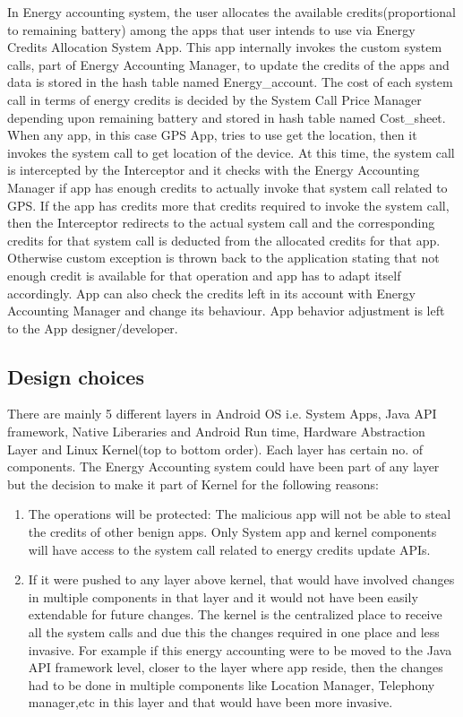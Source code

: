 In Energy accounting system, the user allocates the available credits(proportional to remaining battery) among the apps that user intends to use via Energy Credits Allocation System App. This app internally invokes the custom system calls, part of Energy Accounting Manager, to update the credits of the apps and data is stored in the hash table named Energy\_account. The cost of each system call in terms of energy credits  is decided by the System Call Price Manager depending upon remaining battery and stored in hash table named Cost\_sheet. When any app, in this case GPS App, tries to use get the location, then it invokes the system call to get location of the device. At this time, the system call is intercepted by the Interceptor and it checks with the Energy Accounting Manager if app has enough credits to actually invoke that system call related to GPS. If the app has credits more that credits required to invoke the system call, then the Interceptor redirects to the actual system call and the corresponding credits for that system call is deducted from the allocated credits for that app. Otherwise custom exception is thrown back to the application stating that not enough credit is available for that operation and app has to adapt itself accordingly. App can also check the credits left in its account with Energy Accounting Manager and change its behaviour. App behavior adjustment is left to the App designer/developer.


\subsection{Design choices}

There are mainly 5 different layers in Android OS i.e. System Apps, Java API framework, Native Liberaries and Android Run time, Hardware Abstraction Layer and Linux Kernel(top to bottom order). Each layer has certain no. of components. The Energy Accounting system could have been part of any layer but the decision to make it  part of Kernel for the following reasons:
\begin{enumerate}
	\item  The operations will be protected:
	The malicious app will not be able to steal the credits of other benign apps. Only System app and kernel components will have access to the system call related to energy credits update APIs.
	\item  If it were pushed to any layer above kernel, that would have involved changes in multiple components in that layer and it would not have been easily extendable for future changes.
	The kernel is the centralized place to receive all the system calls and due this the changes required in one place and less invasive. For example if this energy accounting were to be moved to the Java API framework level, closer to the layer where app reside, then the changes had to be done in multiple components like Location Manager, Telephony manager,etc in this layer and that would have been more invasive.
\end{enumerate}


